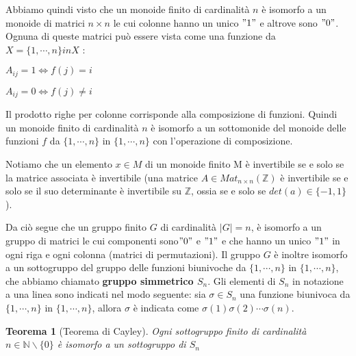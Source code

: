 \documentclass[a4paper,12pt]{article}
\theoremstyle{def}
\theoremstyle{prop}
\theoremstyle{esempio}
\theoremstyle{dimostrazione}
\theoremstyle{teo}
\newtheorem*{teorema}{Teorema}
\theoremstyle{osservazione}
\begin{document}
Abbiamo quindi visto che un monoide finito di cardinalità \(n\) è isomorfo a un monoide di matrici \(n \times n\)
le cui colonne hanno un unico \("1"\) e altrove sono \("0"\).\newline
Ognuna di queste matrici può essere vista come una funzione da \(X = \{1,\cdots,n\} in X\) :\newline
\begin{center}
	\(A_{ij} = 1 \Leftrightarrow f(j) = i\)
\end{center}
\begin{center}
	\(A_{ij} = 0 \Leftrightarrow f(j) \neq i\)
\end{center}
Il prodotto righe per colonne corrisponde alla composizione di funzioni.\newline
Quindi un monoide finito di cardinalità \(n\) è isomorfo a un sottomonide del monoide delle funzioni
\(f\) da \(\{1,\cdots,n\}\) in \(\{1,\cdots,n\}\) con l'operazione di composizione.

Notiamo che un elemento \(x \in M\) di un monoide finito M è invertibile se e solo se la matrice associata è
invertibile (una matrice \(A \in Mat_{n \times n} (\mathbb{Z})\) è invertibile se e solo se il suo determinante è
invertibile su \(\mathbb{Z}\), ossia se e solo se \(det(a) \in \{-1,1\}\)).

Da ciò segue che un gruppo finito \(G\) di cardinalità \(|G|=n\), è isomorfo a un gruppo di matrici le cui componenti
sono\("0"\) e \("1"\) e che hanno un unico \("1"\) in ogni riga e ogni colonna (matrici di permutazioni). \newline
Il gruppo \(G\) è inoltre isomorfo a un sottogruppo del gruppo delle funzioni biunivoche da \(\{1,\cdots,n\}\) in \(\{1,\cdots,n\}\),
che abbiamo chiamato \textbf{gruppo simmetrico \(S_n\)}. \newline
Gli elementi di \(S_n\) in notazione a una linea sono indicati nel modo seguente: sia
\(\sigma \in S_n\) una funzione biunivoca da \(\{1,\cdots,n\}\) in \(\{1,\cdots,n\}\), allora \(\sigma\) è indicata come
\(\sigma(1)\sigma(2)\cdots\sigma(n)\).


\begin{teorema}[Teorema di Cayley]
	Ogni sottogruppo finito di cardinalità \(n \in \mathbb{N} \backslash \{0\}\) è isomorfo a un sottogruppo di \(S_n\)
\end{teorema}
\end{document}
